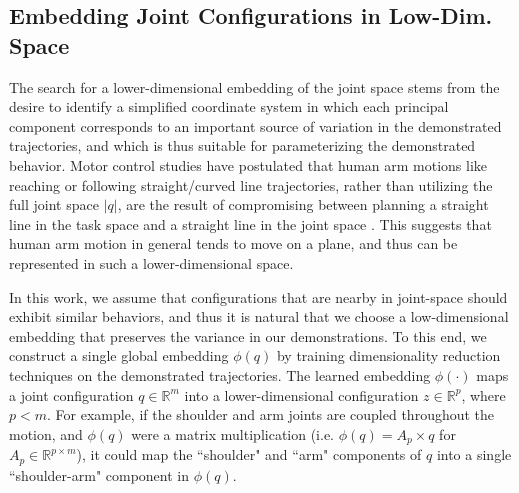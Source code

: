 \documentclass[letterpaper, 10 pt, journal, twoside, fleqn]{IEEEtran}
\begin{document}
\subsection{Embedding Joint Configurations in Low-Dim. Space}
The search for a lower-dimensional embedding of the joint space stems from the desire to identify a simplified coordinate system in which each principal component corresponds to an important source of variation in the demonstrated trajectories, and which is thus suitable for parameterizing the demonstrated behavior. Motor control studies have postulated that human arm motions like reaching or following straight/curved line trajectories, rather than utilizing the full joint space $|q|$, are the result of compromising between planning a straight line in the task space and a straight line in the joint space \cite{Cruse1987humanarm,Okadome1999arm}. This suggests that human arm motion in general tends to move on a plane, and thus can be represented in such a lower-dimensional space. 

In this work, we assume that configurations that are nearby in joint-space should exhibit similar behaviors, and thus it is natural that we choose a low-dimensional embedding that preserves the variance in our demonstrations. To this end, we construct a single global embedding $\phi(q)$ by training dimensionality reduction techniques on the demonstrated trajectories. The learned embedding $\phi(\cdot)$ maps a joint configuration $q \in \mathbb{R}^m$ into a lower-dimensional configuration $z \in \mathbb{R}^p$, where $p < m$. For example, if the shoulder and arm joints are coupled throughout the motion, and $\phi(q)$ were a matrix multiplication (i.e. $\phi(q) = A_p\times q$ for $A_p \in \mathbb{R}^{p\times m}$), it could map the ``shoulder" and ``arm" components of $q$ into a single ``shoulder-arm" component in $\phi(q)$.
\end{document}

